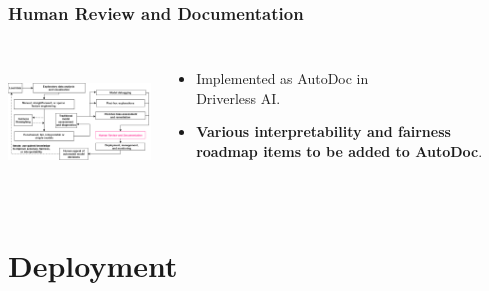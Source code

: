 \documentclass[11pt,
               aspectratio=169,
               hyperref={colorlinks}
               ]{beamer}
\begin{document}
		\begin{frame}
		
			\frametitle{Human Review and Documentation}		
			
			\begin{columns}
	
				\centering
				\includegraphics[height=100pt]{img/hr.png}
				
				\vspace{-5pt}
				\begin{itemize}
					\item Implemented as AutoDoc in\\ Driverless AI.
					\item \textbf{Various interpretability and fairness roadmap items to be added to AutoDoc}.
				\end{itemize}
				
			\end{columns}
		
		\end{frame}

	\section{Deployment}
\end{document}
